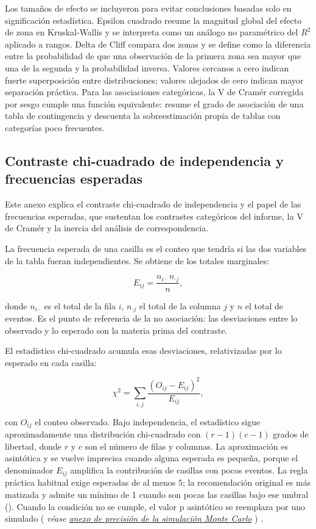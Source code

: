 \documentclass[
  spanish,
  letterpaper,
  DIV=11,
  numbers=noendperiod]{scrartcl}
\newcommand{\asesoriaParenRef}[1]{%
  \textnormal{\textcolor{asesoriaTextColor}{(}}%
  {\hypersetup{linkcolor=asesoriaLinkColor,urlcolor=asesoriaLinkColor,citecolor=asesoriaLinkColor}\textcolor{asesoriaTextColor}{\emph{#1}}}%
  \textnormal{\textcolor{asesoriaTextColor}{)}}%
}
\begin{document}
Los tamaños de efecto se incluyeron para evitar conclusiones basadas
solo en significación estadística. Epsilon cuadrado resume la magnitud
global del efecto de zona en Kruskal-Wallis y se interpreta como un
análogo no paramétrico del \(R^2\) aplicado a rangos. Delta de Cliff
compara dos zonas y se define como la diferencia entre la probabilidad
de que una observación de la primera zona sea mayor que una de la
segunda y la probabilidad inversa. Valores cercanos a cero indican
fuerte superposición entre distribuciones; valores alejados de cero
indican mayor separación práctica. Para las asociaciones categóricas, la
V de Cramér corregida por sesgo cumple una función equivalente: resume
el grado de asociación de una tabla de contingencia y descuenta la
sobreestimación propia de tablas con categorías poco frecuentes.

\subsection{Contraste chi-cuadrado de independencia y frecuencias
esperadas}\label{sec-anexo-chi-esperadas}

Este anexo explica el contraste chi-cuadrado de independencia y el papel
de las frecuencias esperadas, que sustentan los contrastes categóricos
del informe, la V de Cramér y la inercia del análisis de
correspondencia.

La frecuencia esperada de una casilla es el conteo que tendría si las
dos variables de la tabla fueran independientes. Se obtiene de los
totales marginales:

\[
E_{ij}=\frac{n_{i\cdot}\,n_{\cdot j}}{n},
\]

donde \(n_{i\cdot}\) es el total de la fila \(i\), \(n_{\cdot j}\) el
total de la columna \(j\) y \(n\) el total de eventos. Es el punto de
referencia de la no asociación: las desviaciones entre lo observado y lo
esperado son la materia prima del contraste.

El estadístico chi-cuadrado acumula esas desviaciones, relativizadas por
lo esperado en cada casilla:

\[
\chi^2=\sum_{i,j}\frac{(O_{ij}-E_{ij})^2}{E_{ij}},
\]

con \(O_{ij}\) el conteo observado. Bajo independencia, el estadístico
sigue aproximadamente una distribución chi-cuadrado con \((r-1)(c-1)\)
grados de libertad, donde \(r\) y \(c\) son el número de filas y
columnas. La aproximación es asintótica y se vuelve imprecisa cuando
alguna esperada es pequeña, porque el denominador \(E_{ij}\) amplifica
la contribución de casillas con pocos eventos. La regla práctica
habitual exige esperadas de al menos 5; la recomendación original es más
matizada y admite un mínimo de 1 cuando son pocas las casillas bajo ese
umbral (). Cuando la condición
no se cumple, el valor p asintótico se reemplaza por uno simulado
\asesoriaParenRef{véase \hyperref[sec-anexo-montecarlo]{anexo de precisión de la simulación Monte Carlo}}.
\end{document}
